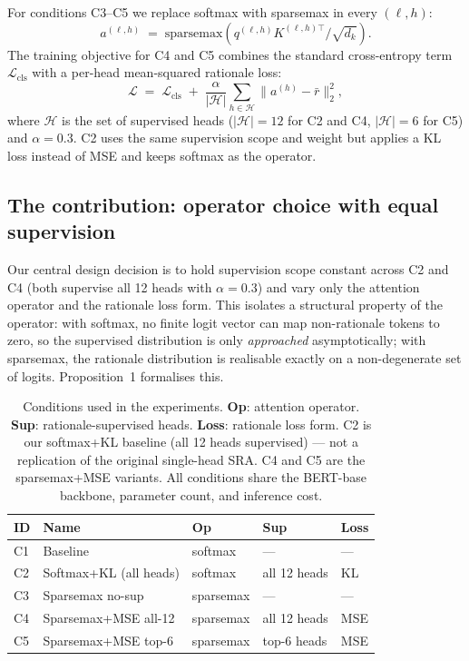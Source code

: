 \documentclass{article}
\begin{document}
For conditions C3--C5 we replace softmax with sparsemax in every $(\ell,h)$:
\begin{equation}
a^{(\ell,h)} \;=\; \mathrm{sparsemax}\!\left( q^{(\ell,h)} K^{(\ell,h)\top} / \sqrt{d_k} \right).
\end{equation}
The training objective for C4 and C5 combines the standard cross-entropy term
$\mathcal{L}_{\mathrm{cls}}$ with a per-head mean-squared rationale loss:
\begin{equation}
\mathcal{L} \;=\; \mathcal{L}_{\mathrm{cls}}
\;+\; \frac{\alpha}{|\mathcal{H}|} \sum_{h \in \mathcal{H}}
\big\| a^{(h)} - \bar r \big\|_2^{2},
\label{eq:loss}
\end{equation}
where $\mathcal{H}$ is the set of supervised heads ($|\mathcal{H}|{=}12$ for C2 and C4,
$|\mathcal{H}|{=}6$ for C5) and $\alpha{=}0.3$. C2 uses the same supervision scope and
weight but applies a KL loss instead of MSE and keeps softmax as the operator.

\subsection{The contribution: operator choice with equal supervision}
\label{sec:contribution}

Our central design decision is to hold supervision scope constant across C2 and C4
(both supervise all 12 heads with $\alpha{=}0.3$) and vary only the attention operator
and the rationale loss form. This isolates a structural property of the operator: with
softmax, no finite logit vector can map non-rationale tokens to zero, so the supervised
distribution is only \emph{approached} asymptotically; with sparsemax, the rationale
distribution is realisable exactly on a non-degenerate set of logits. Proposition~1
formalises this.

\begin{table}[t]
\centering
\caption{Conditions used in the experiments. \textbf{Op}: attention operator.
\textbf{Sup}: rationale-supervised heads. \textbf{Loss}: rationale loss form. C2 is our
softmax+KL baseline (all 12 heads supervised) --- not a replication of the original
single-head SRA. C4 and C5 are the sparsemax+MSE variants. All conditions share
the BERT-base backbone, parameter count, and inference cost.}
\label{tab:conditions}
\small
\begin{tabular}{lllll}
\toprule
\textbf{ID} & \textbf{Name} & \textbf{Op} & \textbf{Sup} & \textbf{Loss} \\
\midrule
C1 & Baseline                          & softmax    & ---           & ---  \\
C2 & Softmax+KL (all heads)            & softmax    & all 12 heads  & KL   \\
C3 & Sparsemax no-sup                  & sparsemax  & ---           & ---  \\
C4 & Sparsemax+MSE all-12              & sparsemax  & all 12 heads  & MSE  \\
C5 & Sparsemax+MSE top-6               & sparsemax  & top-6 heads   & MSE  \\
\bottomrule
\end{tabular}
\end{table}
\end{document}
